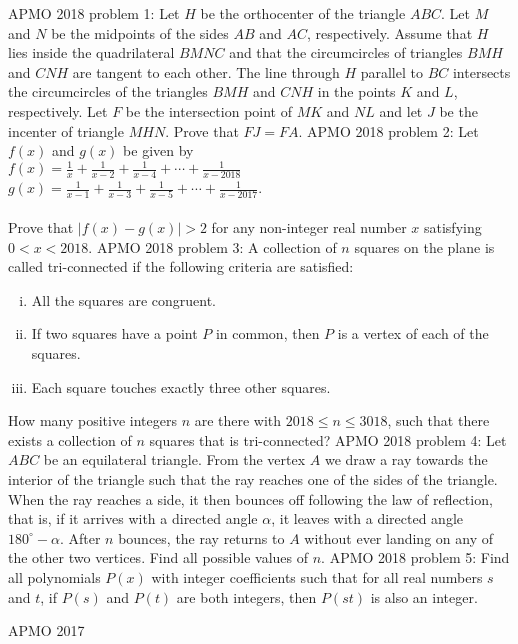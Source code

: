 APMO 2018 problem 1:  Let $H$ be the orthocenter of the triangle $ABC$. Let $M$ and $N$ be the midpoints of the sides $AB$ and $AC$, respectively. Assume that $H$ lies inside the quadrilateral $BMNC$ and that the circumcircles of triangles $BMH$ and $CNH$ are tangent to each other. The line through $H$ parallel to $BC$ intersects the circumcircles of the triangles $BMH$ and $CNH$ in the points $K$ and $L$, respectively. Let $F$ be the intersection point of $MK$ and $NL$ and let $J$ be the incenter of triangle $MHN$. Prove that $F J = F A$. 
APMO 2018 problem 2:  Let $f(x)$ and $g(x)$ be given by \\
$f(x) = \frac{1}{x} + \frac{1}{x-2} + \frac{1}{x-4} + \cdots + \frac{1}{x-2018}$ \\
$g(x) = \frac{1}{x-1} + \frac{1}{x-3} + \frac{1}{x-5} + \cdots + \frac{1}{x-2017}$. \\\\
Prove that $|f(x)-g(x)| >2$ for any non-integer real number $x$ satisfying $0 < x < 2018$. 
APMO 2018 problem 3:  A collection of $n$ squares on the plane is called tri-connected if the following criteria are satisfied:
\begin{enumerate}[(i)]
  \item All the squares are congruent.
  \item If two squares have a point $P$ in common, then $P$ is a vertex of each of the squares.
  \item Each square touches exactly three other squares.
\end{enumerate}
How many positive integers $n$ are there with $2018\leq n \leq 3018$, such that there exists a collection of $n$ squares that is tri-connected? 
APMO 2018 problem 4:  Let $ABC$ be an equilateral triangle. From the vertex $A$ we draw a ray towards the interior of the triangle such that the ray reaches one of the sides of the triangle. When the ray reaches a side, it then bounces off following the law of reflection, that is, if it arrives with a directed angle $\alpha$, it leaves with a directed angle $180^{\circ}-\alpha$. After $n$ bounces, the ray returns to $A$ without ever landing on any of the other two vertices. Find all possible values of $n$. 
APMO 2018 problem 5:  Find all polynomials $P(x)$ with integer coefficients such that for all real numbers $s$ and $t$, if $P(s)$ and $P(t)$ are both integers, then $P(st)$ is also an integer. 

APMO 2017 

